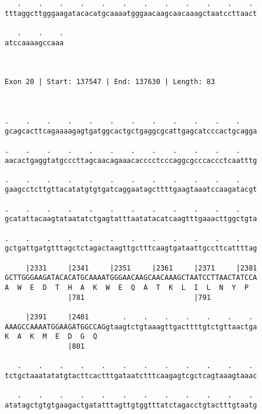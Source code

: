\documentclass{article}
\begin{document}
\begin{Verbatim}
   .    .    .    .    .    .    .    .    .    .    .    . 
tttaggcttgggaagatacacatgcaaaatgggaacaagcaacaaagctaatccttaact
                                                            
   .    .    .
atccaaaagccaaa
              
              
 
Exon 20 | Start: 137547 | End: 137630 | Length: 83



.    .    .    .    .    .    .    .    .    .    .    .    
gcagcacttcagaaaagagtgatggcactgctgaggcgcattgagcatcccactgcagga
                                                            
.    .    .    .    .    .    .    .    .    .    .    .    
aacactgaggtatgcccttagcaacagaaacacccctcccaggcgcccaccctcaatttg
                                                            
.    .    .    .    .    .    .    .    .    .    .    .    
gaagcctcttgttacatatgtgtgatcaggaatagcttttgaagtaaatccaagatacgt
                                                            
.    .    .    .    .    .    .    .    .    .    .    .    
gcatattacaagtataatatctgagtatttaatatacatcaagtttgaaacttggctgta
                                                            
.    .    .    .    .    .    .    .    .    .    .    .    
gctgattgatgtttagctctagactaagttgctttcaagtgataattgccttcattttag
                                                            
     |2331     |2341     |2351     |2361     |2371     |2381
GCTTGGGAAGATACACATGCAAAATGGGAACAAGCAACAAAGCTAATCCTTAACTATCCA
A  W  E  D  T  H  A  K  W  E  Q  A  T  K  L  I  L  N  Y  P  
               |781                          |791           
  
     |2391     |2401        .    .    .    .    .    .    . 
AAAGCCAAAATGGAAGATGGCCAGgtaagtctgtaaagttgacttttgtctgttaactga
K  A  K  M  E  D  G  Q                                      
               |801                                         
  
   .    .    .    .    .    .    .    .    .    .    .    . 
tctgctaaatatatgtacttcactttgataatctttcaagagtcgctcagtaaagtaaac
                                                            
   .    .    .    .    .    .    .    .    .    .    .    . 
atatagctgtgtgaagactgatatttagttgtggtttatctagacctgtactttgtaatg
                                                            

\end{Verbatim}
\end{document}
